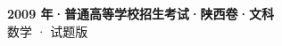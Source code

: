 \documentclass[zihao=-4, a4paper]{ctexart}
\begin{document}
\begin{center}
  {\Large\bfseries 2009 年·普通高等学校招生考试·陕西卷·文科}\\[4pt]
  {\large 数学 · 试题版}
\end{center}
\medskip
{}

\end{document}
